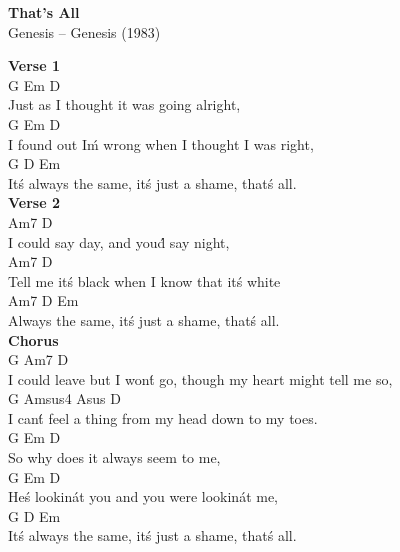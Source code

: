 \documentclass[a4paper]{article}
\begin{document}
    \begin{center}
        \textbf{That's All}
        ~\\
        Genesis -- Genesis (1983)
    \end{center}
    {
        \scriptsize
        \textbf{Verse 1}
        ~\\
        {
            \cutive
            \obeyspaces
           G             Em      D
\\
Just as I thought it was going alright,
\\
                    G           Em            D
\\
I found out I\'m wrong when I thought I was right,
\\
                 G                D             Em
\\
It\'s always the same, it\'s just a shame, that\'s all.
\\

        }
        \textbf{Verse 2}
        ~\\
        {
            \cutive
            \obeyspaces
            Am7                D
\\
I could say day, and you\'d say night,
\\
             Am7                         D
\\
Tell me it\'s black when I know that it\'s white
\\
           Am7               D             Em
\\
Always the same, it\'s just a shame, that\'s all.
\\

        }
        \textbf{Chorus}
        ~\\
        {
            \cutive
            \obeyspaces
            G                              Am7                 D
\\
I could leave but I won\'t go, though my heart might tell me so,
\\
         G                   Amsus4          Asus  D
\\
I can\'t feel a thing from my head down to my toes.
\\
               G      Em      D
\\
So why does it always seem to me,
\\
                G                 Em        D
\\
He\'s lookin\' at you and you were lookin\' at me,
\\
                G                 D             Em 
\\
It\'s always the same, it\'s just a shame, that\'s all.
\\

}}
\end{document}
